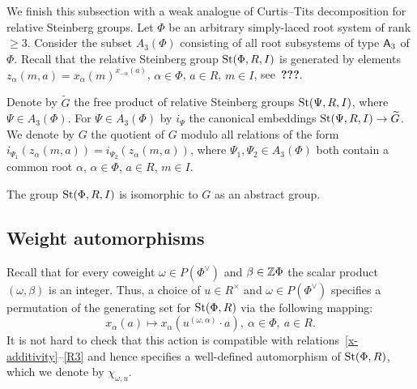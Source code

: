 We finish this subsection with a weak analogue of Curtis--Tits decomposition for relative Steinberg groups.
Let $\Phi$ be an arbitrary simply-laced root system of rank $\geq 3$.
Consider the subset $A_3(\Phi)$ consisting of all root subsystems of type $\mathsf{A}_3$ of $\Phi$.
Recall that the relative Steinberg group $\operatorname{St}(\Phi, R, I)$ is generated by elements
 $z_\alpha(m, a) = x_\alpha(m)^{x_{-\alpha}(a)}$, $\alpha \in \Phi$, $a \in R$, $m \in I$, see~\textbf{???}.

Denote by $\widetilde{G}$ the free product of relative Steinberg groups $\operatorname{St}(\Psi, R, I)$, where $\Psi \in A_3(\Phi)$.
For $\Psi \in A_3(\Phi)$ by $i_\Psi$ the canonical embeddings $\operatorname{St}(\Psi, R, I) \to \widetilde{G}$.
We denote by $G$ the quotient of $G$ modulo all relations of the form $i_{\Psi_1}(z_\alpha(m, a)) = i_{\Psi_2}(z_\alpha(m, a))$,
where $\Psi_1, \Psi_2 \in A_3(\Phi)$ both contain a common root $\alpha$, $\alpha \in \Phi$, $a\in R$, $m \in I$.

\begin{thm}\label{thm:relPres} The group $\operatorname{St}(\Phi, R, I)$ is isomorphic to $G$ as an abstract group. \end{thm}

\subsection{Weight automorphisms}\label{subsec:weight-automorphisms}
Recall that for every coweight $\omega \in P(\Phi^\vee)$ and $\beta \in \mathbb{Z} \Phi$ the scalar product $(\omega, \beta)$ is an integer.
Thus, a choice of $u \in R^\times$ and $\omega \in P(\Phi^\vee)$ specifies a permutation of the generating set for $\operatorname{St}(\Phi, R)$ via the following mapping:
\begin{equation*} x_\alpha(a) \mapsto x_\alpha(u^{(\omega, \alpha)} \cdot a),\ \alpha\in \Phi,\ a \in R. \end{equation*}
It is not hard to check that this action is compatible with relations~\eqref{x-additivity}--\eqref{R3} and hence specifies a well-defined automorphism of $\operatorname{St}(\Phi, R)$, which we denote by $\chi_{\omega, u}$.

